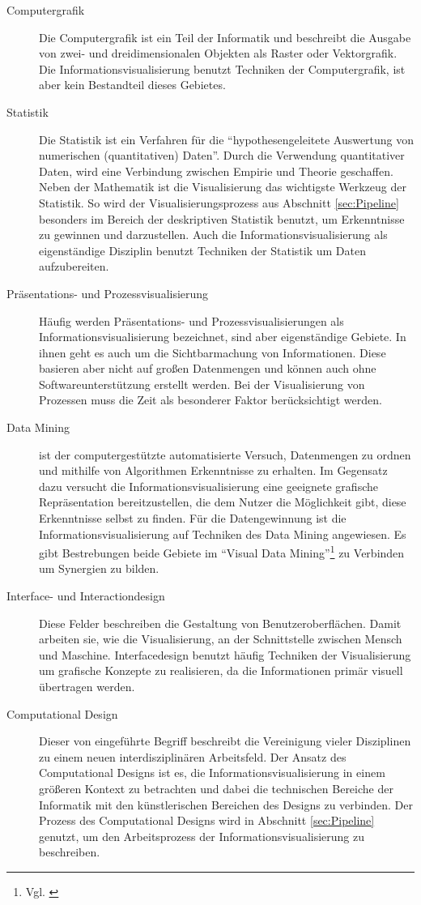 \documentclass[a4paper, 
               12pt,
               DIV=calc,
               version=first,
               pdftex,
               headsepline,
               footsepline,
               bibtotocnumbered,
               liststotocnumbered]{scrreprt}
\begin{document}
\begin{description}
\item[Computergrafik]
Die Computergrafik ist ein Teil der Informatik und beschreibt die Ausgabe von zwei- und dreidimensionalen
Objekten als Raster oder Vektorgrafik. Die Informationsvisualisierung benutzt Techniken der Computergrafik, ist aber kein
Bestandteil dieses Gebietes.
\item[Statistik]
Die Statistik ist ein Verfahren für die "`hypothesengeleitete Auswertung von numerischen (quantitativen)
Daten"'\citep[S.\,23]{Statistik}. Durch die Verwendung quantitativer Daten, wird eine Verbindung zwischen
Empirie und Theorie geschaffen.  Neben der Mathematik ist die Visualisierung das wichtigste
Werkzeug der Statistik. So wird der Visualisierungsprozess aus Abschnitt \ref{sec:Pipeline} besonders
im Bereich der deskriptiven Statistik benutzt, um Erkenntnisse zu gewinnen und darzustellen.
Auch die Informationsvisualisierung als eigenständige Disziplin benutzt Techniken der Statistik um Daten aufzubereiten.
\item[Präsentations- und Prozessvisualisierung]
Häufig werden Präsentations- und Prozessvisualisierungen als Informationsvisualisierung bezeichnet, sind
aber eigenständige Gebiete. In ihnen geht es auch um die Sichtbarmachung von Informationen. Diese basieren aber nicht auf
großen Datenmengen und können auch ohne Softwareunterstützung erstellt werden. Bei der Visualisierung
von Prozessen muss die Zeit als besonderer Faktor berücksichtigt werden.
\item[Data Mining] ist der computergestützte automatisierte Versuch, Datenmengen zu ordnen und mithilfe
von Algorithmen Erkenntnisse zu erhalten. Im Gegensatz dazu versucht die Informationsvisualisierung eine geeignete
grafische Repräsentation
bereitzustellen, die dem Nutzer die Möglichkeit gibt, diese Erkenntnisse selbst zu finden. Für die Datengewinnung
ist die Informationsvisualisierung auf Techniken des Data Mining angewiesen. Es gibt Bestrebungen beide Gebiete 
im "`Visual Data Mining"'\footnote{Vgl. \citep{Keim}} zu Verbinden um Synergien zu bilden.
\item[Interface- und Interactiondesign]
Diese Felder beschreiben die Gestaltung von Benutzeroberflächen. Damit arbeiten sie, wie die Visualisierung, an
der Schnittstelle zwischen Mensch und Maschine. Interfacedesign benutzt häufig Techniken der Visualisierung
um grafische Konzepte zu realisieren, da die Informationen primär visuell übertragen werden.
\item[Computational Design]
Dieser von \citep{BenFry} eingeführte Begriff beschreibt die Vereinigung vieler Disziplinen zu einem neuen
interdisziplinären Arbeitsfeld. Der Ansatz des Computational Designs ist es, die Informationsvisualisierung in einem größeren
Kontext zu betrachten und dabei die technischen Bereiche der Informatik mit den künstlerischen
Bereichen des Designs zu verbinden. Der Prozess des Computational Designs wird in Abschnitt \ref{sec:Pipeline}
genutzt, um den Arbeitsprozess der Informationsvisualisierung zu beschreiben.
\end{description}
\end{document}
